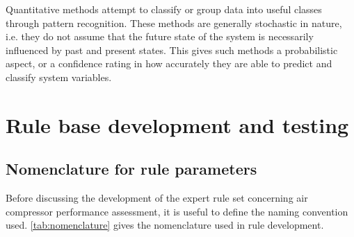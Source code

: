 Quantitative methods attempt to classify or group data into useful classes through pattern recognition. These methods are generally stochastic in nature, i.e. they do not assume that the future state of the system is necessarily influenced by past and present states. This gives such methods a probabilistic aspect, or a confidence rating in how accurately they are able to predict and classify system variables.

\section{Rule base development and testing}
\label{sec:rules}

\subsection{Nomenclature for rule parameters}
\label{subsec:nomenclature}
Before discussing the development of the expert rule set concerning air compressor performance assessment, it is useful to define the naming convention used. \autoref{tab:nomenclature} gives the nomenclature used in rule development.

